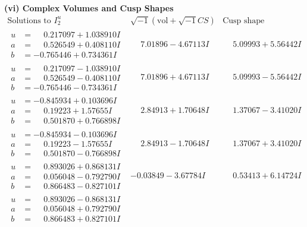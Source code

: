 \documentclass[1p]{elsarticle_modified}
\theoremstyle{definition}
\newcommand{\I}{\sqrt{-1}}
\begin{document}
\newpage\flushleft \textbf{(vi) Complex Volumes and Cusp Shapes}
$$\begin{array}{c|c|c}  
\text{Solutions to }I^u_{2}& \I (\text{vol} + \sqrt{-1}CS) & \text{Cusp shape}\\
 \hline 
\begin{aligned}
u &= \phantom{-}0.217097 + 1.038910 I \\
a &= \phantom{-}0.526549 + 0.408110 I \\
b &= -0.765446 + 0.734361 I\end{aligned}
 & \phantom{-}7.01896 - 4.67113 I & \phantom{-}5.09993 + 5.56442 I \\ \hline\begin{aligned}
u &= \phantom{-}0.217097 - 1.038910 I \\
a &= \phantom{-}0.526549 - 0.408110 I \\
b &= -0.765446 - 0.734361 I\end{aligned}
 & \phantom{-}7.01896 + 4.67113 I & \phantom{-}5.09993 - 5.56442 I \\ \hline\begin{aligned}
u &= -0.845934 + 0.103696 I \\
a &= \phantom{-}0.19223 + 1.57655 I \\
b &= \phantom{-}0.501870 + 0.766898 I\end{aligned}
 & \phantom{-}2.84913 + 1.70648 I & \phantom{-}1.37067 - 3.41020 I \\ \hline\begin{aligned}
u &= -0.845934 - 0.103696 I \\
a &= \phantom{-}0.19223 - 1.57655 I \\
b &= \phantom{-}0.501870 - 0.766898 I\end{aligned}
 & \phantom{-}2.84913 - 1.70648 I & \phantom{-}1.37067 + 3.41020 I \\ \hline\begin{aligned}
u &= \phantom{-}0.893026 + 0.868131 I \\
a &= \phantom{-}0.056048 - 0.792790 I \\
b &= \phantom{-}0.866483 - 0.827101 I\end{aligned}
 & -0.03849 - 3.67784 I & \phantom{-}0.53413 + 6.14724 I \\ \hline\begin{aligned}
u &= \phantom{-}0.893026 - 0.868131 I \\
a &= \phantom{-}0.056048 + 0.792790 I \\
b &= \phantom{-}0.866483 + 0.827101 I\end{aligned}

\end{array}$$
\end{document}
